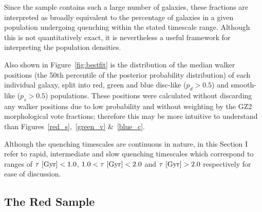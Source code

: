 Since the sample contains such a large number of galaxies, these fractions are interpreted as broadly equivalent to the percentage of galaxies in a given population undergoing quenching within the stated timescale range. Although this is not quantitatively exact, it is nevertheless a useful framework for interpreting the population densities.

Also shown in Figure~\ref{fig:bestfit} is the distribution of the median walker positions (the 50th percentile of the posterior probability distribution) of each individual galaxy, split into red, green and blue disc-like ($p_d > 0.5$) and smooth-like ($p_s > 0.5$) populations. These positions were calculated without discarding any walker positions due to low probability and without weighting by the GZ2 morphological vote fractions; therefore this may be more intuitive to understand than Figures~\ref{red_s},~\ref{green_v} \&~\ref{blue_c}.

Although the quenching timescales are continuous in nature, in this Section I refer to rapid, intermediate and slow quenching timescales which correspond to ranges of  $\tau ~\rm{[Gyr]} < 1.0$, $1.0 < \tau ~\rm{[Gyr]} < 2.0$ and $\tau ~\rm{[Gyr]} > 2.0$ respectively for ease of discussion.



\subsection{The Red Sample}\label{rs}

